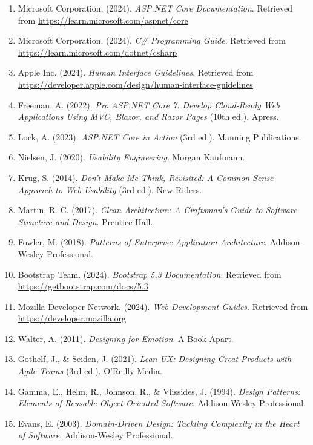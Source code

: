 \documentclass[12pt,a4paper]{article}
\begin{document}
\begin{enumerate}[leftmargin=*]
    \item Microsoft Corporation. (2024). \textit{ASP.NET Core Documentation}. Retrieved from \url{https://learn.microsoft.com/aspnet/core}
    
    \item Microsoft Corporation. (2024). \textit{C\# Programming Guide}. Retrieved from \url{https://learn.microsoft.com/dotnet/csharp}
    
    \item Apple Inc. (2024). \textit{Human Interface Guidelines}. Retrieved from \url{https://developer.apple.com/design/human-interface-guidelines}
    
    \item Freeman, A. (2022). \textit{Pro ASP.NET Core 7: Develop Cloud-Ready Web Applications Using MVC, Blazor, and Razor Pages} (10th ed.). Apress.
    
    \item Lock, A. (2023). \textit{ASP.NET Core in Action} (3rd ed.). Manning Publications.
    
    \item Nielsen, J. (2020). \textit{Usability Engineering}. Morgan Kaufmann.
    
    \item Krug, S. (2014). \textit{Don't Make Me Think, Revisited: A Common Sense Approach to Web Usability} (3rd ed.). New Riders.
    
    \item Martin, R. C. (2017). \textit{Clean Architecture: A Craftsman's Guide to Software Structure and Design}. Prentice Hall.
    
    \item Fowler, M. (2018). \textit{Patterns of Enterprise Application Architecture}. Addison-Wesley Professional.
    
    \item Bootstrap Team. (2024). \textit{Bootstrap 5.3 Documentation}. Retrieved from \url{https://getbootstrap.com/docs/5.3}
    
    \item Mozilla Developer Network. (2024). \textit{Web Development Guides}. Retrieved from \url{https://developer.mozilla.org}
    
    \item Walter, A. (2011). \textit{Designing for Emotion}. A Book Apart.
    
    \item Gothelf, J., \& Seiden, J. (2021). \textit{Lean UX: Designing Great Products with Agile Teams} (3rd ed.). O'Reilly Media.
    
    \item Gamma, E., Helm, R., Johnson, R., \& Vlissides, J. (1994). \textit{Design Patterns: Elements of Reusable Object-Oriented Software}. Addison-Wesley Professional.
    
    \item Evans, E. (2003). \textit{Domain-Driven Design: Tackling Complexity in the Heart of Software}. Addison-Wesley Professional.
\end{enumerate}
\end{document}
